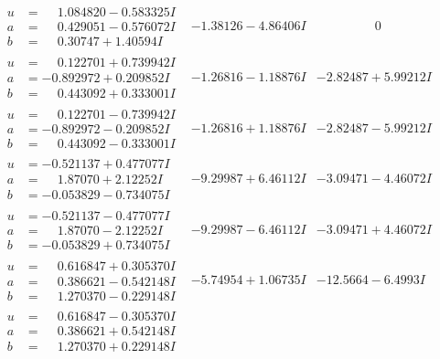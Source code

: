\documentclass[1p]{elsarticle_modified}
\theoremstyle{definition}
\begin{document}
$$\begin{array}{c|c|c}
\begin{aligned}
u &= \phantom{-}1.084820 - 0.583325 I \\
a &= \phantom{-}0.429051 - 0.576072 I \\
b &= \phantom{-}0.30747 + 1.40594 I\end{aligned}
 & -1.38126 - 4.86406 I & \phantom{-0.000000 } 0 \\ \hline\begin{aligned}
u &= \phantom{-}0.122701 + 0.739942 I \\
a &= -0.892972 + 0.209852 I \\
b &= \phantom{-}0.443092 + 0.333001 I\end{aligned}
 & -1.26816 - 1.18876 I & -2.82487 + 5.99212 I \\ \hline\begin{aligned}
u &= \phantom{-}0.122701 - 0.739942 I \\
a &= -0.892972 - 0.209852 I \\
b &= \phantom{-}0.443092 - 0.333001 I\end{aligned}
 & -1.26816 + 1.18876 I & -2.82487 - 5.99212 I \\ \hline\begin{aligned}
u &= -0.521137 + 0.477077 I \\
a &= \phantom{-}1.87070 + 2.12252 I \\
b &= -0.053829 - 0.734075 I\end{aligned}
 & -9.29987 + 6.46112 I & -3.09471 - 4.46072 I \\ \hline\begin{aligned}
u &= -0.521137 - 0.477077 I \\
a &= \phantom{-}1.87070 - 2.12252 I \\
b &= -0.053829 + 0.734075 I\end{aligned}
 & -9.29987 - 6.46112 I & -3.09471 + 4.46072 I \\ \hline\begin{aligned}
u &= \phantom{-}0.616847 + 0.305370 I \\
a &= \phantom{-}0.386621 - 0.542148 I \\
b &= \phantom{-}1.270370 - 0.229148 I\end{aligned}
 & -5.74954 + 1.06735 I & -12.5664 - 6.4993 I \\ \hline\begin{aligned}
u &= \phantom{-}0.616847 - 0.305370 I \\
a &= \phantom{-}0.386621 + 0.542148 I \\
b &= \phantom{-}1.270370 + 0.229148 I\end{aligned}

\end{array}$$
\end{document}
